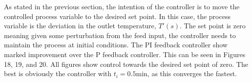 \documentclass{article}
\begin{document}
As stated in the previous section, the intention of the controller is to move the controlled process variable to the desired set point. In this case, the process variable is the deviation in the outlet temperature, $T'(s)$. The set point is zero meaning given some perturbation from the feed input, the controller needs to maintain the process at initial conditions. The PI feedback controller show marked improvement over the P feedback controller. This can be seen in Figures 18, 19, and 20. All figures show control towards the desired set point of zero. The best is obviously the controller with $t_i=0.5\si{\minute}$, as this converges the fastest. 
\end{document}

